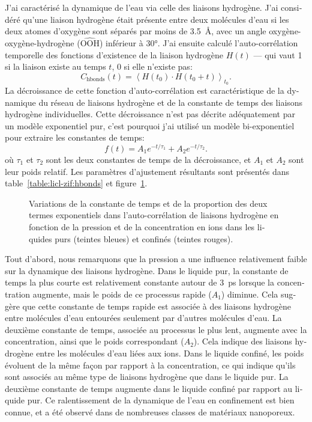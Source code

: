 \documentclass[thesis]{subfiles}
\begin{document}
\begin{otherlanguage}{french}
J'ai caractérisé la dynamique de l'eau via celle des liaisons hydrogène. J'ai
considéré qu'une liaison hydrogène était présente entre deux molécules d'eau si
les deux atomes d'oxygène sont séparés par moins de \SI{3.5}{\AA}, avec un
angle oxygène-oxygène-hydrogène ($\widehat{\text{OOH}}$) inférieur à 30°. J'ai
ensuite calculé l'auto-corrélation temporelle des fonctions d'existence de la
liaison hydrogène $H(t)$ --- qui vaut 1 si la liaison existe au temps $t$, 0 si
elle n'existe pas:
\[C_{\text{hbonds}}(t) = \left\langle H(t_0) \cdot H(t_0 + t) \right\rangle_{t_0}. \]
La décroissance de cette fonction d'auto-corrélation est caractéristique de la
dynamique du réseau de liaisons hydrogène et de la constante de temps des liaisons
hydrogène individuelles. Cette décroissance n'est pas décrite adéquatement par
un modèle exponentiel pur, c'est pourquoi j'ai utilisé un modèle bi-exponentiel
pour extraire les constantes de temps:
\[ f(t) = A_1 e^{-t / \tau_1} + A_2 e^{-t / \tau_2}.\]
où $\tau_1$ et $\tau_2$ sont les deux constantes de temps de la décroissance, et
$A_1$ et $A_2$ sont leur poids relatif. Les paramètres d'ajustement résultants
sont présentés dans table~\ref{table:licl-zif:hbonds} et
figure~\ref{fig:fr:licl-zif:hbonds:fit:pressure}.

\begin{figure}[ht]
    \centering
    
    \caption{Variations de la constante de temps et de la proportion des deux
    termes exponentiels dans l'auto-corrélation de liaisons hydrogène en fonction
    de la pression et de la concentration en ions dans les liquides purs
    (teintes bleues) et confinés (teintes rouges).}
    \label{fig:fr:licl-zif:hbonds:fit:pressure}
\end{figure}

Tout d'abord, nous remarquons que la pression a une influence relativement
faible sur la dynamique des liaisons hydrogène. Dans le liquide pur, la
constante de temps la plus courte est relativement constante autour de
\SI{3}{ps} lorsque la concentration augmente, mais le poids de ce processus
rapide ($A_1$) diminue. Cela suggère que cette constante de temps rapide est
associée à des liaisons hydrogène entre molécules d'eau entourées seulement par
d'autres molécules d'eau. La deuxième constante de temps, associée au processus
le plus lent, augmente avec la concentration, ainsi que le poids correspondant
($A_2$). Cela indique des liaisons hydrogène entre les molécules d'eau liées aux
ions. Dans le liquide confiné, les poids évoluent de la même façon par rapport à
la concentration, ce qui indique qu'ils sont associés au même type de liaisons
hydrogène que dans le liquide pur. La deuxième constante de temps augmente dans
le liquide confiné par rapport au liquide pur. Ce ralentissement de la
dynamique de l'eau en confinement est bien connue\cite{Fogarty2014}, et a été
observé dans de nombreuses classes de matériaux nanoporeux\cite{Jeffery2004,
RomeroVargasCastrillon2009, Haigis2013, Scalfi2018}.


\end{otherlanguage}
\end{document}
